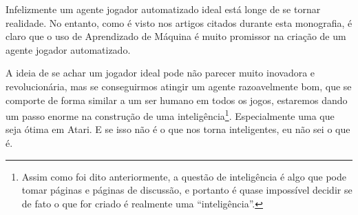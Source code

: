 \documentclass[a4paper,10pt]{article}
\theoremstyle{plain}
\begin{document}
Infelizmente um agente jogador automatizado ideal está longe de se tornar realidade. No entanto,
como é visto nos artigos citados durante esta monografia, é claro que o uso de Aprendizado de
Máquina é muito promissor na criação de um agente jogador automatizado.

A ideia de se achar um jogador ideal pode não parecer muito inovadora e revolucionária, mas se
conseguirmos atingir um agente razoavelmente bom, que se comporte de forma similar a um ser humano
em todos os jogos, estaremos dando um passo enorme na construção de uma inteligência\footnote{Assim
como foi dito anteriormente, a questão de inteligência é algo que pode tomar páginas e páginas de
discussão, e portanto é quase impossível decidir se de fato o que for criado é realmente uma
``inteligência''.}. Especialmente uma que seja ótima em Atari. E se isso não é o que nos torna
inteligentes, eu não sei o que é.

\newpage
\printbibliography
\end{document}

